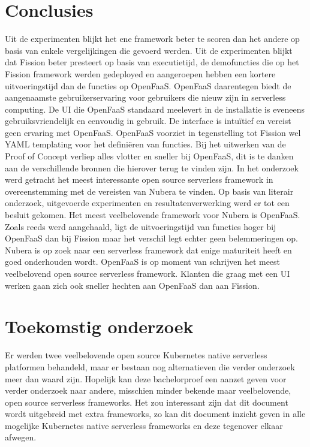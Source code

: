 \documentclass[a0,portrait]{a0poster}
\begin{document}
\begin{multicols}{2}
\section*{Conclusies}
\color{black}
Uit de experimenten blijkt het ene framework beter te scoren dan het andere op basis van enkele vergelijkingen die gevoerd werden. Uit de experimenten blijkt dat Fission beter presteert op basis van executietijd, de demofuncties die op het Fission framework werden gedeployed en aangeroepen hebben een kortere uitvoeringstijd dan de functies op OpenFaaS. OpenFaaS daarentegen biedt de aangenaamste gebruikerservaring voor gebruikers die nieuw zijn in serverless computing. De UI die OpenFaaS standaard meelevert in de installatie is eveneens gebruiksvriendelijk en eenvoudig in gebruik. De interface is intuïtief en vereist geen ervaring met OpenFaaS. OpenFaaS voorziet in tegenstelling tot Fission wel YAML templating voor het definiëren van functies. Bij het uitwerken van de Proof of Concept verliep alles vlotter en sneller bij OpenFaaS, dit is te danken aan de verschillende bronnen die hierover terug te vinden zijn. In het onderzoek werd getracht het meest interessante open source serverless framework in overeenstemming met de vereisten van Nubera te vinden. Op basis van literair onderzoek, uitgevoerde experimenten en resultatenverwerking werd er tot een besluit gekomen. Het meest veelbelovende framework voor Nubera is OpenFaaS. Zoals reeds werd aangehaald, ligt de uitvoeringstijd van functies hoger bij OpenFaaS dan bij Fission maar het verschil legt echter geen belemmeringen op. Nubera is op zoek naar een serverless framework dat enige maturiteit heeft en goed onderhouden wordt. OpenFaaS is op moment van schrijven het meest veelbelovend open source serverless framework. Klanten die graag met een UI werken gaan zich ook sneller hechten aan OpenFaaS dan aan Fission.

\color{HoGentAccent1} 
\section*{Toekomstig onderzoek}
\color{black}
Er werden twee veelbelovende open source Kubernetes native serverless platformen behandeld, maar er bestaan nog alternatieven die verder onderzoek meer dan waard zijn. Hopelijk kan deze bachelorproef een aanzet geven voor verder onderzoek naar andere, misschien minder bekende maar veelbelovende, open source serverless frameworks. Het zou interessant zijn dat dit document wordt uitgebreid met extra frameworks, zo kan dit document inzicht geven in alle mogelijke Kubernetes native serverless frameworks en deze tegenover elkaar afwegen.
\end{multicols}
\end{document}
